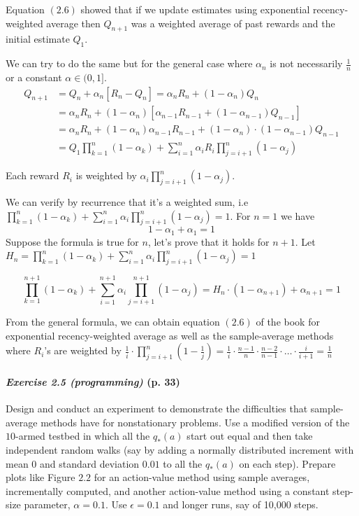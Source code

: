 \documentclass[10pt,a4paper]{article}
\begin{document}
Equation $(2.6)$ showed that if we update estimates using exponential recency-weighted average then $Q_{n+1}$ was a weighted average of past rewards and the initial estimate $Q_1$.

We can try to do the same but for the general case where $\alpha_n$ is not necessarily $\frac{1}{n}$ or a constant $\alpha \in (0,1]$.
\begin{equation}
\begin{split}
Q_{n+1} &= Q_n + \alpha_n [R_n - Q_n] = \alpha_n R_n + (1-\alpha_n) Q_n\\
&= \alpha_n R_n + (1-\alpha_n) [\alpha_{n-1} R_{n-1} + (1-\alpha_{n-1})Q_{n-1}]\\
&= \alpha_n R_n + (1-\alpha_n) \alpha_{n-1} R_{n-1} + (1-\alpha_n)\cdot (1-\alpha_{n-1})Q_{n-1}\\
&= Q_1 \prod_{k=1}^n (1-\alpha_k) + \sum_{i=1}^n \alpha_i R_i \prod_{j=i+1}^n (1-\alpha_j)
\end{split}
\end{equation}

Each reward $R_i$ is weighted by $\alpha_i \prod_{j=i+1}^n (1-\alpha_j)$.

\bigskip
We can verify by recurrence that it's a weighted sum, i.e $\prod_{k=1}^n (1-\alpha_k) + \sum_{i=1}^n \alpha_i \prod_{j=i+1}^n (1-\alpha_j) = 1$. For $n=1$ we have
\begin{equation}
1-\alpha_1 + \alpha_1 = 1
\end{equation}
Suppose the formula is true for $n$, let's prove that it holds for $n+1$. Let $H_n = \prod_{k=1}^n (1-\alpha_k) + \sum_{i=1}^n \alpha_i \prod_{j=i+1}^n (1-\alpha_j) = 1$

\begin{equation}
\prod_{k=1}^{n+1} (1-\alpha_k) + \sum_{i=1}^{n+1} \alpha_i \prod_{j=i+1}^{n+1} (1-\alpha_j) = H_n \cdot (1-\alpha_{n+1}) + \alpha_{n+1} = 1
\end{equation}

From the general formula, we can obtain equation $(2.6)$ of the book for exponential recency-weighted average as well as the sample-average methods where $R_i$'s are weighted by $\frac{1}{i} \cdot \prod_{j=i+1}^n \left(1-\frac{1}{j}\right) = \frac{1}{i} \cdot \frac{n-1}{n} \cdot \frac{n-2}{n-1} \cdot \hdots \cdot \frac{i}{i+1} = \frac{1}{n}$

\clearpage
\paragraph{\textit{Exercise 2.5 (programming)} (p. 33)} Design and conduct an experiment to demonstrate the
difficulties that sample-average methods have for nonstationary problems. Use a modified version of the $10$-armed testbed in which all the $q_*(a)$ start out equal and then take independent random walks (say by adding a normally distributed increment with mean $0$ and standard deviation $0.01$ to all the $q_*(a)$ on each step). Prepare plots like Figure $2.2$
for an action-value method using sample averages, incrementally computed, and another action-value method using a constant step-size parameter, $\alpha = 0.1$. Use $\epsilon = 0.1$ and
longer runs, say of 10,000 steps.
\end{document}
